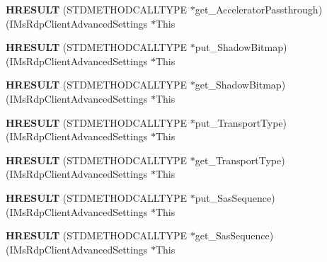 \begin{DoxyCompactItemize}
{\bfseries H\+R\+E\+S\+U\+LT} (S\+T\+D\+M\+E\+T\+H\+O\+D\+C\+A\+L\+L\+T\+Y\+PE $\ast$get\+\_\+\+Accelerator\+Passthrough)(I\+Ms\+Rdp\+Client\+Advanced\+Settings $\ast$This
\item 
\mbox{\label{struct_i_ms_rdp_client_advanced_settings_vtbl_a3f98b255988504e9006d17c945f70c1c}} 
{\bfseries H\+R\+E\+S\+U\+LT} (S\+T\+D\+M\+E\+T\+H\+O\+D\+C\+A\+L\+L\+T\+Y\+PE $\ast$put\+\_\+\+Shadow\+Bitmap)(I\+Ms\+Rdp\+Client\+Advanced\+Settings $\ast$This
\item 
\mbox{\label{struct_i_ms_rdp_client_advanced_settings_vtbl_ac759e65e211bbaf39efa8f05dd0ce300}} 
{\bfseries H\+R\+E\+S\+U\+LT} (S\+T\+D\+M\+E\+T\+H\+O\+D\+C\+A\+L\+L\+T\+Y\+PE $\ast$get\+\_\+\+Shadow\+Bitmap)(I\+Ms\+Rdp\+Client\+Advanced\+Settings $\ast$This
\item 
\mbox{\label{struct_i_ms_rdp_client_advanced_settings_vtbl_acbf1b671505759568642322a9f2ba35a}} 
{\bfseries H\+R\+E\+S\+U\+LT} (S\+T\+D\+M\+E\+T\+H\+O\+D\+C\+A\+L\+L\+T\+Y\+PE $\ast$put\+\_\+\+Transport\+Type)(I\+Ms\+Rdp\+Client\+Advanced\+Settings $\ast$This
\item 
\mbox{\label{struct_i_ms_rdp_client_advanced_settings_vtbl_af5ca2fb69ab9764b219dc7bef5b17769}} 
{\bfseries H\+R\+E\+S\+U\+LT} (S\+T\+D\+M\+E\+T\+H\+O\+D\+C\+A\+L\+L\+T\+Y\+PE $\ast$get\+\_\+\+Transport\+Type)(I\+Ms\+Rdp\+Client\+Advanced\+Settings $\ast$This
\item 
\mbox{\label{struct_i_ms_rdp_client_advanced_settings_vtbl_aa6f8acc22a4e5d00c4276af17b01daef}} 
{\bfseries H\+R\+E\+S\+U\+LT} (S\+T\+D\+M\+E\+T\+H\+O\+D\+C\+A\+L\+L\+T\+Y\+PE $\ast$put\+\_\+\+Sas\+Sequence)(I\+Ms\+Rdp\+Client\+Advanced\+Settings $\ast$This
\item 
\mbox{\label{struct_i_ms_rdp_client_advanced_settings_vtbl_a280876871370ef255fd936ca193d8dbb}} 
{\bfseries H\+R\+E\+S\+U\+LT} (S\+T\+D\+M\+E\+T\+H\+O\+D\+C\+A\+L\+L\+T\+Y\+PE $\ast$get\+\_\+\+Sas\+Sequence)(I\+Ms\+Rdp\+Client\+Advanced\+Settings $\ast$This
\item 

\end{DoxyCompactItemize}

